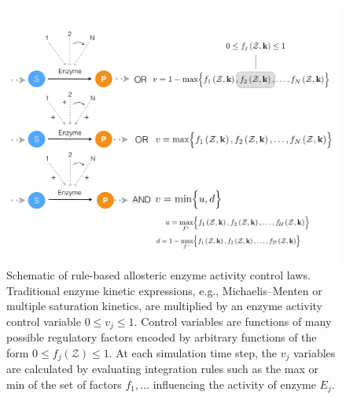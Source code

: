 \documentclass[12pt]{article}
\begin{document}
\clearpage

\begin{figure}
\centering
\includegraphics[width=1.0\textwidth]{./figs/Figure-2-ControlSchematic.pdf}
\caption{Schematic of rule-based allosteric enzyme activity control laws. 
Traditional enzyme kinetic expressions, e.g., Michaelis–Menten or multiple saturation kinetics, are multiplied by an enzyme activity control variable $0 \leq v_{j} \leq 1 $. 
Control variables are functions of many possible regulatory factors encoded by arbitrary functions of the form $0\leq f_{j}\left(\mathcal{Z}\right)\leq 1$.
At each simulation time step, the $v_{j}$ variables are calculated by evaluating integration rules such as the max or min of the set of factors $f_{1},\hdots$ 
influencing the activity of enzyme $E_{j}$. }\label{fig-control-schematic}
\end{figure}

\clearpage
\end{document}
